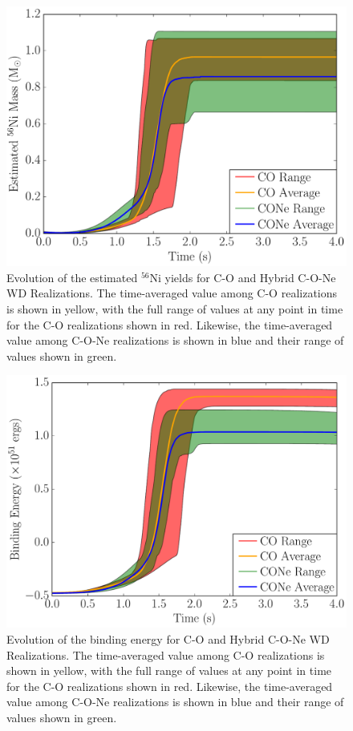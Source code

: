 \documentclass[iop,apj]{emulateapj}
\begin{document}
\begin{figure}[!ht]
\includegraphics[width=\linewidth]{figures/cf_shaded/estimated_Ni56_mass.pdf}
\caption{\label{fig:est_ni_mass} Evolution of the estimated $^{56}$Ni yields for C-O and Hybrid C-O-Ne WD Realizations. The time-averaged value among C-O realizations is shown in yellow, with the full range of values at any point in time for the C-O realizations shown in red. Likewise, the time-averaged value among C-O-Ne realizations is shown in blue and their range of values shown in green.}
\end{figure}
\begin{figure}[!ht]
	\includegraphics[width=\linewidth]{figures/cf_shaded/E_binding.pdf}
	\caption{\label{fig:e_binding} Evolution of the binding energy for C-O and Hybrid C-O-Ne WD Realizations. The time-averaged value among C-O realizations is shown in yellow, with the full range of values at any point in time for the C-O realizations shown in red. Likewise, the time-averaged value among C-O-Ne realizations is shown in blue and their range of values shown in green.}
\end{figure}
\end{document}
